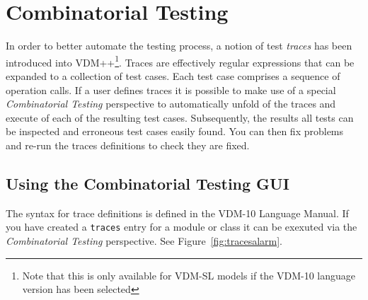 \documentclass{overturerepchap}
\begin{document}
\chapter{Combinatorial Testing}\label{sec:testing}

In order to better automate the testing process, a notion of
test \emph{traces} has been introduced into VDM++\footnote{Note that this is 
only available for VDM-SL models if the VDM-10 language version has been selected}. 
Traces are effectively regular expressions that can be expanded to a collection of test
cases. Each test case comprises a sequence of operation
calls. If a user defines traces it is possible to make use of a
special \emph{Combinatorial Testing} perspective to automatically
unfold of the traces and execute of each of the resulting test
cases. Subsequently, the results all tests can be inspected
and erroneous test cases easily found. You can then fix 
problems and re-run the traces definitions to check they are fixed.

\section{Using the Combinatorial Testing GUI}

The syntax for trace definitions is defined in the VDM-10 Language
Manual.
If you have created a \texttt{traces} entry for a module or class it
can be exexuted via the \emph{Combinatorial Testing}
perspective. See
Figure~\ref{fig:tracesalarm}.
\end{document}
